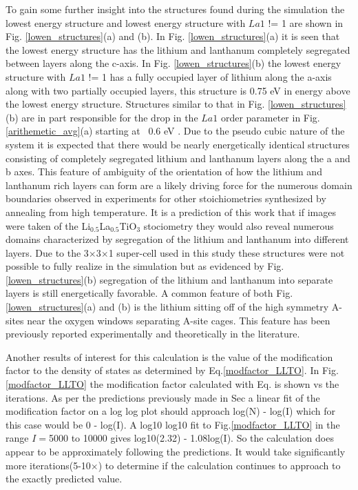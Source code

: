 \documentclass[aps,pre,reprint,superscriptaddress,showkeys]{revtex4-2}
\begin{document}
To gain some further insight into the structures found during the simulation the  lowest energy structure and lowest energy structure with $La1$ != 1 are  shown in  Fig. \ref{lowen_structures}(a) and (b). In Fig. \ref{lowen_structures}(a) it is seen that the lowest energy structure has the lithium and lanthanum completely segregated between layers along the c-axis. In Fig. \ref{lowen_structures}(b)  the  lowest energy structure with $La1$ != 1  has a fully occupied layer of lithium along the a-axis along with two partially occupied layers, this structure is 0.75 eV in energy above the lowest energy structure. Structures similar to that in Fig. \ref{lowen_structures}(b) are in part responsible for the drop in the $La1$ order parameter in Fig. \ref{arithemetic_avg}(a) starting at ~0.6 eV .  Due to the pseudo cubic nature of the system it is expected that there would be nearly energetically identical structures  consisting of completely segregated lithium and lanthanum layers along the a and b axes. This feature of ambiguity of the orientation of how the lithium and lanthanum rich layers can form  are a likely driving force for the numerous domain boundaries observed in experiments for other stoichiometries synthesized by annealing from high temperature\cite{imaginaryphonons,domainboundaries}. It is a prediction of this work that if images were taken of the Li$_0.5$La$_0.5$TiO$_3$ stociometry they would also reveal numerous domains characterized by segregation of the lithium and lanthanum into different layers.  Due to the 3$\times$3$\times$1 super-cell used in this study these structures were not possible to fully realize in the simulation but as evidenced by Fig. \ref{lowen_structures}(b) segregation of the lithium and lanthanum into separate layers is still energetically favorable. A common feature of both Fig. \ref{lowen_structures}(a) and (b) is the lithium sitting off of the high symmetry A-sites near the oxygen windows separating A-site cages. This feature has been previously reported experimentally and theoretically in the literature\cite{Asitedistribution,imaginaryphonons,Li_La_ordering_computational,lithiumpos}. 

Another results of interest for this calculation is the value of the modification factor to the density of states as determined by Eq.\ref{modfactor_LLTO}. In Fig.\ref{modfactor_LLTO} the modification factor calculated with Eq.  \label{modfactor_LLTO} is shown vs the iterations. As per the predictions previously made in Sec   a linear fit of the modification factor on a log log plot should approach log(N) - log(I) which for this case would be 0 - log(I). A log10 log10 fit to Fig.\ref{modfactor_LLTO} in the range $I=$5000 to 10000 gives log10(2.32) - 1.08log(I). So the calculation does appear to be approximately following the predictions. It would take significantly more iterations(5-10$\times$) to determine if the calculation continues to approach to the exactly predicted value. 
\end{document}
